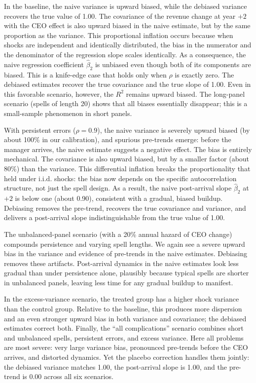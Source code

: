 \documentclass[11pt,a4paper]{article}
\begin{document}
In the baseline, the naive variance is upward biased, while the debiased variance recovers the true value of 1.00. The covariance of the revenue change at year $+2$ with the CEO effect is also upward biased in the naive estimate, but by the same proportion as the variance. This proportional inflation occurs because when shocks are independent and identically distributed, the bias in the numerator and the denominator of the regression slope scales identically. As a consequence, the naive regression coefficient $\hat\beta_2$ is unbiased even though both of its components are biased. This is a knife-edge case that holds only when $\rho$ is exactly zero. The debiased estimates recover the true covariance and the true slope of 1.00. Even in this favorable scenario, however, the $R^2$ remains upward biased. The long-panel scenario (spells of length 20) shows that all biases essentially disappear; this is a small-sample phenomenon in short panels.

With persistent errors ($\rho=0.9$), the naive variance is severely upward biased (by about 100\% in our calibration), and spurious pre-trends emerge: before the manager arrives, the naive estimate suggests a negative effect. The bias is entirely mechanical. The covariance is also upward biased, but by a smaller factor (about 80\%) than the variance. This differential inflation breaks the proportionality that held under i.i.d. shocks: the bias now depends on the specific autocorrelation structure, not just the spell design. As a result, the naive post-arrival slope $\hat\beta_2$ at $+2$ is below one (about 0.90), consistent with a gradual, biased buildup. Debiasing removes the pre-trend, recovers the true covariance and variance, and delivers a post-arrival slope indistinguishable from the true value of 1.00.

The unbalanced-panel scenario (with a 20\% annual hazard of CEO change) compounds persistence and varying spell lengths. We again see a severe upward bias in the variance and evidence of pre-trends in the naive estimates. Debiasing removes these artifacts. Post-arrival dynamics in the naive estimates look less gradual than under persistence alone, plausibly because typical spells are shorter in unbalanced panels, leaving less time for any gradual buildup to manifest.

In the excess-variance scenario, the treated group has a higher shock variance than the control group. Relative to the baseline, this produces more dispersion and an even stronger upward bias in both variance and covariance; the debiased estimates correct both. Finally, the ``all complications'' scenario combines short and unbalanced spells, persistent errors, and excess variance. Here all problems are most severe: very large variance bias, pronounced pre-trends before the CEO arrives, and distorted dynamics. Yet the placebo correction handles them jointly: the debiased variance matches 1.00, the post-arrival slope is 1.00, and the pre-trend is 0.00 across all six scenarios. 
\end{document}
